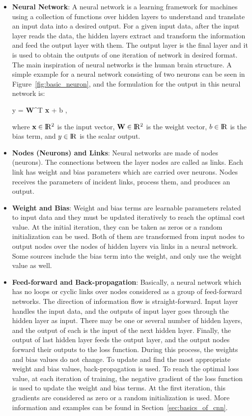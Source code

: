 \begin{itemize}
	
	\item \textbf{Neural Network}: A neural network is a learning framework for machines using a collection of functions over hidden layers to understand and translate an input data into a desired output. For a given input data, after the input layer reads the data, the hidden layers extract and transform the information and feed the output layer with them. The output layer is the final layer and it is used to obtain the outputs of one iteration of network in desired format. The main inspiration of neural networks is the human brain structure. A simple example for a neural network consisting of two neurons can be seen in Figure~\ref{fig:basic_neuron}, and the formulation for the output in this neural network is:
	
	\be 
	y = \textbf{W}^{T} \textbf{x} + b \:,
	\ee
	
	where $\textbf{x} \in \rm I\!R^{2}$ is the input vector, $\textbf{W} \in \rm I\!R^{2}$ is the weight vector, $b \in \rm I\!R$ is the bias term, and $y \in \rm I\!R$ is the scalar output.
	
	\item \textbf{Nodes (Neurons) and Links}:  Neural networks are made of nodes (neurons). The connections between the layer nodes are called as links. Each link has weight and bias parameters which are carried over neurons. Nodes receives the parameters of incident links, process them, and produces an output.
	
	\item \textbf{Weight and Bias}: Weight and bias terms are learnable parameters related to input data and they must be updated iteratively to reach the optimal cost value. At the initial iteration, they can be taken as zeros or a random initialization can be used. Both of them are transformed from input nodes to output nodes over the nodes of hidden layers via links in a neural network. Some sources include the bias term into the weight, and only use the weight value as well.
	
	\item \textbf{Feed-forward and Back-propagation}: Basically, a neural network which has no loops or cyclic links over nodes considered as a group of feed-forward networks. The direction of information flow is straight-forward. Input layer handles the input data, and the outputs of input layer goes through the hidden layer as input. There may be one or several number of hidden layers, and the output of each is the input of the next hidden layer. Finally, the output of last hidden layer feeds the output layer, and the output nodes forward their outputs to the loss function. During this process, the weights and bias values do not change. To update and find the most appropriate weight and bias values, back-propagation is used. To reach the optimal loss value, at each iteration of training, the negative gradient of the loss function is used to update the weight and bias terms. At the first iteration, this gradients are considered as zero or a random initialization is used. More information and examples can be found in Section~\ref{sec:basics_of_cnn}.
	

\end{itemize}
